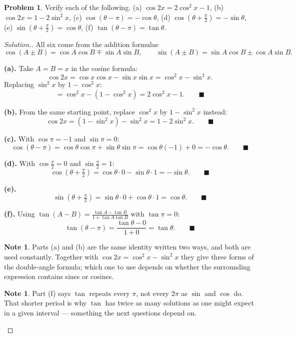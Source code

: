 \documentclass[11pt,a4paper]{article}
\theoremstyle{definition}
\newtheorem{note}[thm]{Note}
\newtheorem{problemx}{Problem}[section]
\newenvironment{problem}{\begin{problemx}}{\end{problemx}}
\newenvironment{solution}
  {\renewcommand{\qedsymbol}{}\begin{proof}[\textit{Solution}.]}
  {\end{proof}}
\begin{document}
\begin{problem}
Verify each of the following.
\quad (a) $\cos 2x=2\cos^2x-1$, \quad (b) $\cos 2x=1-2\sin^2x$, \quad
(c) $\cos(\theta-\pi)=-\cos\theta$, \quad
(d) $\cos\left(\theta+\frac{\pi}{2}\right)=-\sin\theta$, \quad
(e) $\sin\left(\theta+\frac{\pi}{2}\right)=\cos\theta$, \quad
(f) $\tan(\theta-\pi)=\tan\theta$.
\end{problem}

\begin{solution}
All six come from the addition formulae
$$\cos(A\pm B)=\cos A\cos B\mp\sin A\sin B,\qquad
\sin(A\pm B)=\sin A\cos B\pm\cos A\sin B.$$

\textbf{(a).} Take $A=B=x$ in the cosine formula:
$$\cos 2x=\cos x\cos x-\sin x\sin x=\cos^2x-\sin^2x.$$
Replacing $\sin^2x$ by $1-\cos^2x$:
$$=\cos^2x-\left(1-\cos^2x\right)=2\cos^2x-1.\qquad\blacksquare$$

\textbf{(b).} From the same starting point, replace $\cos^2x$ by $1-\sin^2x$ instead:
$$\cos 2x=\left(1-\sin^2x\right)-\sin^2x=1-2\sin^2x.\qquad\blacksquare$$

\textbf{(c).} With $\cos\pi=-1$ and $\sin\pi=0$:
$$\cos(\theta-\pi)=\cos\theta\cos\pi+\sin\theta\sin\pi=\cos\theta(-1)+0
=-\cos\theta.\qquad\blacksquare$$

\textbf{(d).} With $\cos\frac{\pi}{2}=0$ and $\sin\frac{\pi}{2}=1$:
$$\cos\left(\theta+\tfrac{\pi}{2}\right)=\cos\theta\cdot 0-\sin\theta\cdot 1
=-\sin\theta.\qquad\blacksquare$$

\textbf{(e).}
$$\sin\left(\theta+\tfrac{\pi}{2}\right)=\sin\theta\cdot 0+\cos\theta\cdot 1
=\cos\theta.\qquad\blacksquare$$

\textbf{(f).} Using $\tan(A-B)=\frac{\tan A-\tan B}{1+\tan A\tan B}$ with
$\tan\pi=0$:
$$\tan(\theta-\pi)=\frac{\tan\theta-0}{1+0}=\tan\theta.\qquad\blacksquare$$

\begin{note}
Parts (a) and (b) are the same identity written two ways, and both are used constantly.
Together with $\cos 2x=\cos^2x-\sin^2x$ they give three forms of the double-angle
formula; which one to use depends on whether the surrounding expression contains sines
or cosines.
\end{note}

\begin{note}
Part (f) says $\tan$ repeats every $\pi$, not every $2\pi$ as $\sin$ and $\cos$ do. That
shorter period is why $\tan$ has twice as many solutions as one might expect in a given
interval --- something the next questions depend on.
\end{note}
\end{solution}
\end{document}
